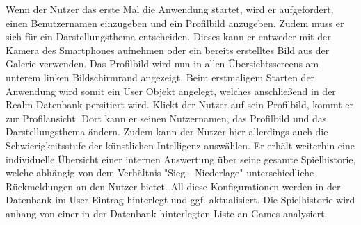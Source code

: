 \documentclass{scrartcl}
\begin{document}
\noindent
Wenn der Nutzer das erste Mal die Anwendung startet, wird er aufgefordert, einen Benutzernamen einzugeben und ein Profilbild anzugeben. Zudem muss er sich für ein Darstellungsthema entscheiden.
Dieses kann er entweder mit der Kamera des Smartphones aufnehmen oder ein bereits erstelltes Bild aus der Galerie verwenden.
Das Profilbild wird nun in allen Übersichtsscreens am unterem linken Bildschirmrand angezeigt.
Beim erstmaligem Starten der Anwendung wird somit ein User Objekt angelegt, welches anschließend in der Realm Datenbank persitiert wird. \newline
Klickt der Nutzer auf sein Profilbild, kommt er zur Profilansicht. Dort kann er seinen Nutzernamen, das Profilbild und das Darstellungsthema ändern.
Zudem kann der Nutzer hier allerdings auch die Schwierigkeitsstufe der künstlichen Intelligenz auswählen. Er erhält weiterhin eine individuelle Übersicht einer internen Auswertung über seine gesamte Spielhistorie, 
welche abhängig von dem Verhältnis "Sieg - Niederlage" unterschiedliche Rückmeldungen an den Nutzer bietet.
All diese Konfigurationen werden in der Datenbank im User Eintrag hinterlegt und ggf. aktualisiert. Die Spielhistorie wird anhang von einer in der Datenbank hinterlegten Liste an Games analysiert.
\end{document}

